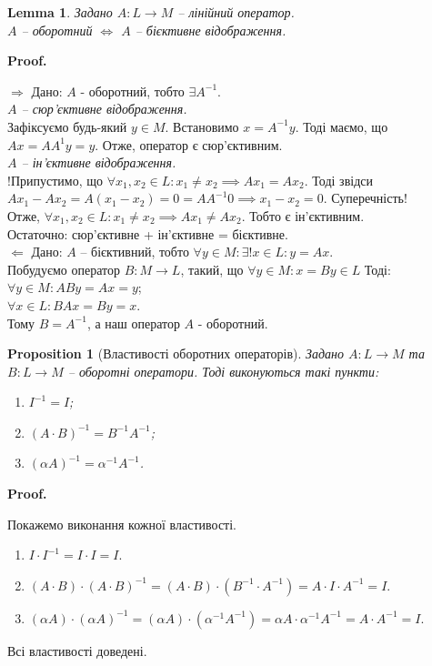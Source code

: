 \documentclass[a4paper, 10pt]{article}
\makeatletter
\def\rightproof{$\boxed{\Rightarrow}$ }
\def\leftproof{$\boxed{\Leftarrow}$ }
\theoremstyle{theoremdd}
\newtheorem{proposition}[theorem]{Proposition}
\newtheorem{lemma}[theorem]{Lemma}
\renewenvironment{proof}[1][Proof.\\]{\par
\pushQED{\hfill \qed}%
\normalfont \topsep6\p@\@plus6\p@\relax
\trivlist
\item\relax
{\bfseries
#1\@addpunct{.}}\hspace\labelsep\ignorespaces
}{%
\popQED\endtrivlist\@endpefalse
}
\makeatother
\begin{document}
	\begin{lemma}
	\label{invertibility_criterion}
	Задано $A \colon L \to M$ -- лінійний оператор.\\
	$A$ -- оборотний $\iff$ $A$ -- бієктивне відображення.
	\end{lemma}
	
	\begin{proof}
	\rightproof Дано: $A$ - оборотний, тобто $\exists A^{-1}$.\\
	\textit{$A$ -- сюр'єктивне відображення.}\\
	Зафіксуємо будь-який $y \in M$. Встановимо $x = A^{-1}y$. Тоді маємо, що $Ax = AA^{1}y = y$. Отже, оператор є сюр'єктивним.\\
	\textit{$A$ -- ін'єктивне відображення.}\\
	!Припустимо, що $\forall x_1,x_2 \in L: x_1 \neq x_2 \implies Ax_1 = Ax_2$. Тоді звідси $Ax_1 - Ax_2 = A(x_1-x_2)=0=AA^{-1}0 \implies x_1 - x_2 = 0$. Суперечність! \\
	Отже, $\forall x_1,x_2 \in L: x_1 \neq x_2 \implies Ax_1 \neq Ax_2$. Тобто є ін'єктивним.\\
	Остаточно: сюр'єктивне + ін'єктивне = бієктивне.
	\bigskip \\
	\leftproof Дано: $A$ -- бієктивний, тобто $\forall y \in M: \exists! x \in L: y=  Ax$.\\
	Побудуємо оператор $B \colon M \to L$, такий, що $\forall y \in M: x = By \in L$ Тоді:\\
	$\forall y \in M: ABy = Ax = y$;\\
	$\forall x \in L: BAx = By = x$.\\
	Тому $B = A^{-1}$, а наш оператор $A$ - оборотний.
	\end{proof}
	
	\begin{proposition}[Властивості оборотних операторів]
	Задано $A \colon L \to M$ та $B \colon L \to M$ -- оборотні оператори. Тоді виконуються такі пункти:
	\begin{enumerate}[nosep, wide=0pt, label={\arabic*)}]
	\item $I^{-1} = I$;
	\item $(A \cdot B)^{-1} = B^{-1} A^{-1}$;
	\item $(\alpha A)^{-1} = \alpha^{-1} A^{-1}$.
	\end{enumerate}
	\end{proposition}
	
	\begin{proof}
	Покажемо виконання кожної властивості.
	\begin{enumerate}[topsep=-\parskip, wide=0pt, label={\arabic*)}]
	\item $I \cdot I^{-1} = I \cdot I = I$.
	\item $(A \cdot B) \cdot (A \cdot B)^{-1} = (A \cdot B) \cdot (B^{-1} \cdot A^{-1}) = A \cdot I \cdot A^{-1} = I$.
	\item $(\alpha A) \cdot (\alpha A)^{-1} = (\alpha A) \cdot (\alpha^{-1} A^{-1}) = \alpha A \cdot \alpha^{-1} A^{-1} = A \cdot A^{-1} = I$.
	\end{enumerate}
	Всі властивості доведені.
	\end{proof}
	
\end{document}
